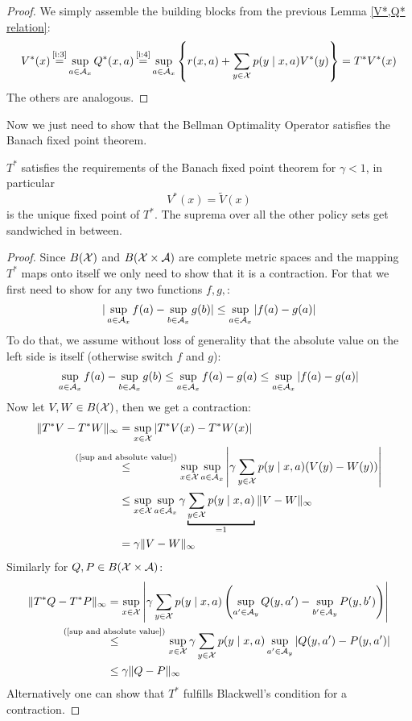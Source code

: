 \begin{proof}
	We simply assemble the building blocks from the previous Lemma \ref{V*,Q* relation}:
\begin{align*}
	V^*(x)\xeq{\text{\ref{i:3}}}\sup_{a\in\cA_x}Q^*(x,a)
	\xeq{\text{\ref{i:4}}}\sup_{a\in\cA_x}\left\{r(x,a)+\sum_{y\in\cX}p(y\mid x,a) V^*(y)\right\} =T^*V^*(x)
\end{align*}
The others are analogous.
\end{proof}

Now we just need to show that the Bellman Optimality Operator satisfies the Banach fixed point theorem.

\begin{thm}\label{T^* satisfies BFT}
\(T^*\) satisfies the requirements of the Banach fixed point theorem for \(\gamma<1\), in particular
	\[V^*(x)=\tilde{V}(x) \]
is the unique fixed point of \(T^*\). The suprema over all the other policy sets get sandwiched in between.
\end{thm}
\begin{proof}
	\parencite[79]{szepesvariAlgorithmsReinforcementLearning2010} 
	Since \(B(\mathcal{X})\) and \(B(\mathcal{X}\times\mathcal{A})\) are complete metric spaces and the mapping \(T^*\) maps onto itself we only need to show that it is a contraction. For that we first need to show for any two functions \(f,g,\):
	\begin{align}\label{sup and absolute value}
		|\sup_{a\in\mathcal{A}_x} f(a) -\sup_{b\in\mathcal{A}_x}g(b)| \le \sup_{a\in\mathcal{A}_x}|f(a)-g(a)|
	\end{align}
	To do that, we assume without loss of generality that the absolute value on the left side is itself (otherwise switch \(f\) and \(g\)):
	\begin{align*}
		\sup_{a\in\mathcal{A}_x} f(a) -\sup_{b\in\mathcal{A}_x}g(b) \le \sup_{a\in\mathcal{A}_x} f(a)- g(a)\le \sup_{a\in\mathcal{A}_x}|f(a)-g(a)|
	\end{align*}
	Now let \(V, W \in B(\mathcal{X}) \), then we get a contraction:
	\begin{align*}
		\|T^*V -T^*W\|_\infty
		&=\sup_{x\in\cX} |T^*V(x) -T^*W(x)|\\
		&\lxlq{\text{(\ref{sup and absolute value})}}\sup_{x\in\cX}\sup_{a\in\cA_x}
		\left|\gamma\sum_{y\in\cX}p(y\mid x,a) (V(y) -W(y))\right|\\
		&\le \sup_{x\in\cX}\sup_{a\in\cA_x} 
		\gamma\underbracket[1pt]{\sum_{y\in\cX}p(y\mid x,a)}_{=1} \|V-W\|_\infty\\
		&=\gamma \|V-W\|_\infty
	\end{align*}
	Similarly for \(Q, P\in B(\mathcal{X}\times\mathcal{A})\):
	\begin{align*}
		\|T^*Q -T^*P\|_\infty
		&=\sup_{x\in\cX} \left|\gamma \sum_{y\in\cX} p(y\mid x,a) 
		\left(\sup_{a'\in\cA_y}Q(y, a') -\sup_{b'\in\cA_y}P(y,b') \right) \right|\\
		&\lxlq{\text{(\ref{sup and absolute value})}}\sup_{x\in\cX} 
		\gamma \sum_{y\in\cX} p(y\mid x,a) \sup_{a'\in\cA_y} |Q(y, a')-P(y,a')|\\
		&\le \gamma \|Q-P\|_\infty \qedhere
	\end{align*}
	Alternatively one can show that \(T^*\) fulfills Blackwell's condition for a contraction. 
\end{proof}

